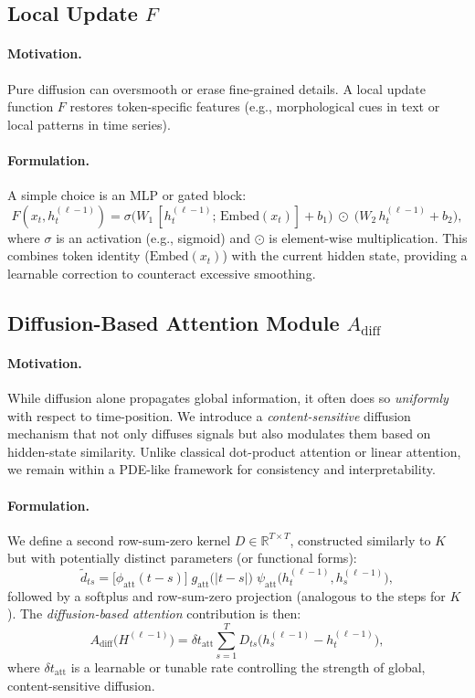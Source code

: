 \subsection{Local Update \texorpdfstring{\(F\)}{}}
\paragraph{Motivation.}
Pure diffusion can oversmooth or erase fine-grained details. A local update function \(F\) restores token-specific features (e.g., morphological cues in text or local patterns in time series).

\paragraph{Formulation.}
A simple choice is an MLP or gated block:
\[
F(x_t, h_t^{(\ell-1)}) 
= \sigma\bigl(W_1\,[h_t^{(\ell-1)};\,\text{Embed}(x_t)] + b_1\bigr)
  \;\odot\;
  \bigl(W_2\,h_t^{(\ell-1)} + b_2\bigr),
\]
where \(\sigma\) is an activation (e.g., sigmoid) and \(\odot\) is element-wise multiplication. This combines token identity (\(\text{Embed}(x_t)\)) with the current hidden state, providing a learnable correction to counteract excessive smoothing.

\subsection{Diffusion-Based Attention Module \texorpdfstring{\(A_{\text{diff}}\)}{}}
\paragraph{Motivation.}
While diffusion alone propagates global information, it often does so \emph{uniformly} with respect to time-position. We introduce a \emph{content-sensitive} diffusion mechanism that not only diffuses signals but also modulates them based on hidden-state similarity. Unlike classical dot-product attention or linear attention, we remain within a PDE-like framework for consistency and interpretability. 

\paragraph{Formulation.}
We define a second row-sum-zero kernel 
\(\displaystyle D \in \mathbb{R}^{T\times T}\),
constructed similarly to \(K\) but with potentially distinct parameters (or functional forms):
\[
\tilde{d}_{ts}
= \bigl[\phi_{\text{att}}(t-s)\bigr]
  \; g_{\text{att}}\bigl(\lvert t-s\rvert\bigr)
  \; \psi_{\text{att}}\bigl(h_t^{(\ell-1)}, h_s^{(\ell-1)}\bigr),
\]
followed by a softplus and row-sum-zero projection (analogous to the steps for \(K\)). The \emph{diffusion-based attention} contribution is then:
\[
A_{\text{diff}}\bigl(H^{(\ell-1)}\bigr)
= \delta t_{\text{att}}
  \sum_{s=1}^{T} D_{ts}\bigl( h_s^{(\ell-1)} - h_t^{(\ell-1)}\bigr),
\]
where \(\delta t_{\text{att}}\) is a learnable or tunable rate controlling the strength of global, content-sensitive diffusion.

